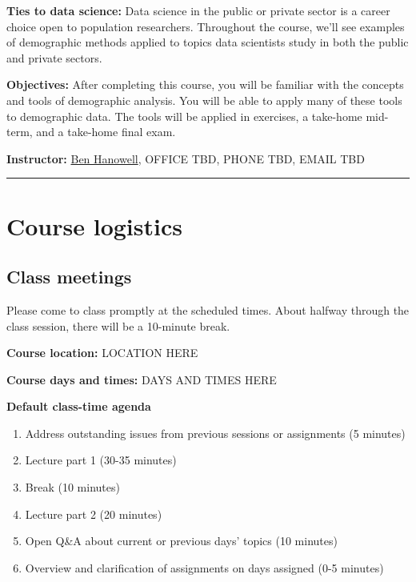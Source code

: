 \documentclass[
]{book}
\providecommand{\tightlist}{%
  \setlength{\itemsep}{0pt}\setlength{\parskip}{0pt}}
\begin{document}
\textbf{Ties to data science:} Data science in the public or private sector is a career choice open to population researchers. Throughout the course, we'll see examples of demographic methods applied to topics data scientists study in both the public and private sectors.

\textbf{Objectives:} After completing this course, you will be familiar with the concepts and tools of demographic analysis. You will be able to apply many of these tools to demographic data. The tools will be applied in exercises, a take-home mid-term, and a take-home final exam.

\textbf{Instructor:} \href{https://www.adpri.org/about/?tab=1\&subtab=1\%3A3128}{Ben Hanowell}, OFFICE TBD, PHONE TBD, EMAIL TBD

\begin{center}\rule{0.5\linewidth}{0.5pt}\end{center}

\hypertarget{course-logistics}{%
\section*{Course logistics}\label{course-logistics}}

\hypertarget{class-meetings}{%
\subsection*{Class meetings}\label{class-meetings}}

Please come to class promptly at the scheduled times. About halfway through the class session, there will be a 10-minute break.

\textbf{Course location:} LOCATION HERE

\textbf{Course days and times:} DAYS AND TIMES HERE

\textbf{Default class-time agenda}

\begin{enumerate}
\def\labelenumi{\arabic{enumi}.}
\tightlist
\item
  Address outstanding issues from previous sessions or assignments (5 minutes)
\item
  Lecture part 1 (30-35 minutes)
\item
  Break (10 minutes)
\item
  Lecture part 2 (20 minutes)
\item
  Open Q\&A about current or previous days' topics (10 minutes)
\item
  Overview and clarification of assignments on days assigned (0-5 minutes)
\end{enumerate}
\end{document}
